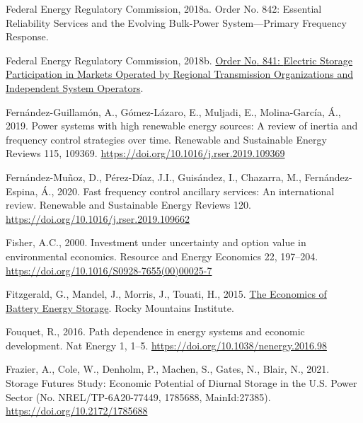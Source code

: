\documentclass[12pt,a4paper,]{report}
\newlength{\cslhangindent}
\newenvironment{CSLReferences}[2] %
 {%
  \setlength{\parindent}{0pt}
  \ifodd #1 \everypar{\setlength{\hangindent}{\cslhangindent}}\ignorespaces\fi
  \ifnum #2 > 0
  \setlength{\parskip}{#2\baselineskip}
  \fi
 }%
 {}
\begin{document}
\begin{CSLReferences}{1}{0}
\leavevmode{}%
Federal Energy Regulatory Commission, 2018a. Order {No}. 842: {Essential
Reliability Services} and the {Evolving Bulk-Power System}---{Primary
Frequency Response}.

\leavevmode{}%
Federal Energy Regulatory Commission, 2018b.
\href{https://www.ferc.gov/media/order-no-841}{Order {No}. 841:
{Electric Storage Participation} in {Markets Operated} by {Regional
Transmission Organizations} and {Independent System Operators}}.

\leavevmode{}%
Fernández-Guillamón, A., Gómez-Lázaro, E., Muljadi, E., Molina-García,
Á., 2019. Power systems with high renewable energy sources: {A} review
of inertia and frequency control strategies over time. Renewable and
Sustainable Energy Reviews 115, 109369.
\url{https://doi.org/10.1016/j.rser.2019.109369}

\leavevmode{}%
Fernández-Muñoz, D., Pérez-Díaz, J.I., Guisández, I., Chazarra, M.,
Fernández-Espina, Á., 2020. Fast frequency control ancillary services:
{An} international review. Renewable and Sustainable Energy Reviews 120.
\url{https://doi.org/10.1016/j.rser.2019.109662}

\leavevmode{}%
Fisher, A.C., 2000. Investment under uncertainty and option value in
environmental economics. Resource and Energy Economics 22, 197--204.
\url{https://doi.org/10.1016/S0928-7655(00)00025-7}

\leavevmode{}%
Fitzgerald, G., Mandel, J., Morris, J., Touati, H., 2015.
\href{https://rmi.org/insight/economics-battery-energy-storage/}{The
{Economics} of {Battery Energy Storage}}. {Rocky Mountains Institute}.

\leavevmode{}%
Fouquet, R., 2016. Path dependence in energy systems and economic
development. Nat Energy 1, 1--5.
\url{https://doi.org/10.1038/nenergy.2016.98}

\leavevmode{}%
Frazier, A., Cole, W., Denholm, P., Machen, S., Gates, N., Blair, N.,
2021. Storage {Futures Study}: {Economic Potential} of {Diurnal Storage}
in the {U}.{S}. {Power Sector} (No. NREL/TP-6A20-77449, 1785688,
MainId:27385). \url{https://doi.org/10.2172/1785688}


\end{CSLReferences}
\end{document}
